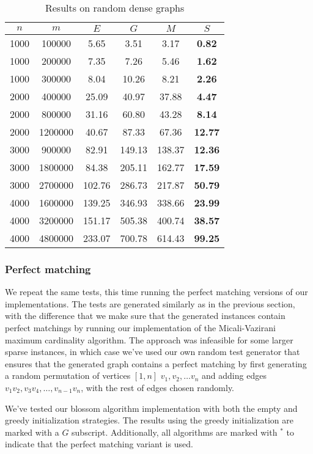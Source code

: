 \begin{table}
\centering
\begin{tabular}{cc|cccc}
$n$ & $m$ & $E$ & $G$ & $M$ & $S$ \\
\hline
1000 & 100000 & 5.65 & 3.51 & 3.17 & \textbf{0.82} \\
1000 & 200000 & 7.35 & 7.26 & 5.46 & \textbf{1.62} \\
1000 & 300000 & 8.04 & 10.26 & 8.21 & \textbf{2.26} \\
2000 & 400000 & 25.09 & 40.97 & 37.88 & \textbf{4.47} \\
2000 & 800000 & 31.16 & 60.80 & 43.28 & \textbf{8.14} \\
2000 & 1200000 & 40.67 & 87.33 & 67.36 & \textbf{12.77} \\
3000 & 900000 & 82.91 & 149.13 & 138.37 & \textbf{12.36} \\
3000 & 1800000 & 84.38 & 205.11 & 162.77 & \textbf{17.59} \\
3000 & 2700000 & 102.76 & 286.73 & 217.87 & \textbf{50.79} \\
4000 & 1600000 & 139.25 & 346.93 & 338.66 & \textbf{23.99} \\
4000 & 3200000 & 151.17 & 505.38 & 400.74 & \textbf{38.57} \\
4000 & 4800000 & 233.07 & 700.78 & 614.43 & \textbf{99.25} \\
\end{tabular}
\caption{Results on random dense graphs}\label{tab:dense}
\end{table}

\subsubsection*{Perfect matching}

We repeat the same tests, this time running the perfect matching versions of our implementations. The tests are generated similarly as in the previous section, with the difference that we make sure that the generated instances contain perfect matchings by running our implementation of the Micali-Vazirani maximum cardinality algorithm. The approach was infeasible for some larger sparse instances, in which case we've used our own random test generator that ensures that the generated graph contains a perfect matching by first generating a random permutation of vertices $[1, n]$ $v_1, v_2, \dots v_n$ and adding edges $v_1v_2, v_3v_4, \dots, v_{n-1}v_n$, with the rest of edges chosen randomly.

We've tested our blossom algorithm implementation with both the empty and greedy initialization strategies. The results using the greedy initialization are marked with a $G$ subscript. Additionally, all algorithms are marked with $^*$ to indicate that the perfect matching variant is used.

